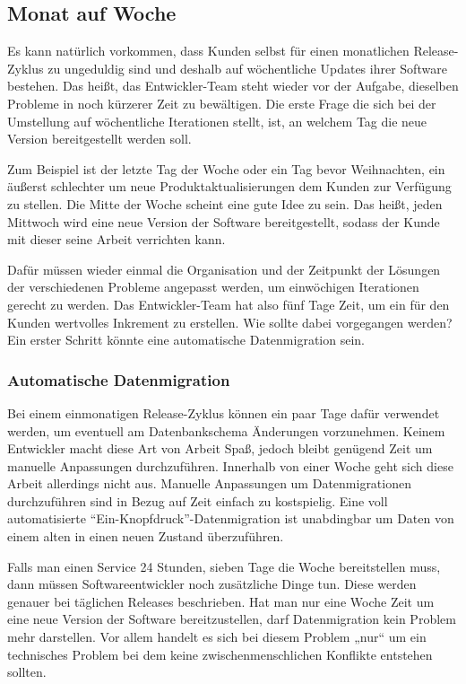 \subsection{Monat auf Woche}
\label{subsec:monat-auf-woche}

Es kann natürlich vorkommen, dass Kunden selbst für einen monatlichen Release-Zyklus zu ungeduldig sind und deshalb auf wöchentliche Updates ihrer Software bestehen. Das heißt, das Entwickler-Team steht wieder vor der Aufgabe, dieselben Probleme in noch kürzerer Zeit zu bewältigen. Die erste Frage die sich bei der Umstellung auf wöchentliche Iterationen stellt, ist, an welchem Tag die neue Version bereitgestellt werden soll.

Zum Beispiel ist der letzte Tag der Woche oder ein Tag bevor Weihnachten, ein äußerst schlechter um neue Produktaktualisierungen dem Kunden zur Verfügung zu stellen. Die Mitte der Woche scheint eine gute Idee zu sein. Das heißt, jeden Mittwoch wird eine neue Version der Software bereitgestellt, sodass der Kunde mit dieser seine Arbeit verrichten kann. 

Dafür müssen wieder einmal die Organisation und der Zeitpunkt der Lösungen der verschiedenen Probleme angepasst werden, um einwöchigen Iterationen gerecht zu werden. Das Entwickler-Team hat also fünf Tage Zeit, um ein für den Kunden wertvolles Inkrement zu erstellen. Wie sollte dabei vorgegangen werden? Ein erster Schritt könnte eine automatische Datenmigration sein.

\subsubsection{Automatische Datenmigration}

Bei einem einmonatigen Release-Zyklus können ein paar Tage dafür verwendet werden, um eventuell am Datenbankschema Änderungen vorzunehmen. Keinem Entwickler macht diese Art von Arbeit Spaß, jedoch bleibt genügend Zeit um manuelle Anpassungen durchzuführen. Innerhalb von einer Woche geht sich diese Arbeit allerdings nicht aus. Manuelle Anpassungen um Datenmigrationen durchzuführen sind in Bezug auf Zeit einfach zu kostspielig. Eine voll automatisierte \enquote{Ein-Knopfdruck}-Datenmigration ist unabdingbar um Daten von einem alten in einen neuen Zustand überzuführen. 

Falls man einen Service 24 Stunden, sieben Tage die Woche bereitstellen muss, dann müssen Softwareentwickler noch zusätzliche Dinge tun. Diese werden genauer bei täglichen Releases beschrieben. Hat man nur eine Woche Zeit um eine neue Version der Software bereitzustellen, darf Datenmigration kein Problem mehr darstellen. Vor allem handelt es sich bei diesem Problem „nur“ um ein  technisches Problem bei dem keine zwischenmenschlichen Konflikte entstehen sollten. 

